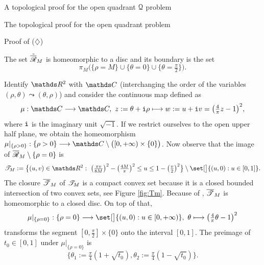 \documentclass[11pt, a4paper, english, twoside, notitlepage, openright]{report}
\begin{document}
\begin{chapter}{A topological proof for the open quadrant $\Qu$ problem}
\begin{section}{The topological proof for the open quadrant problem}
\begin{subsection}{Proof of ($\diamondsuit$)}
\begin{constr}
\begin{center}
\begin{tikzpicture}[scale=1.5]
\end{tikzpicture}
\end{center}

\em
\end{constr}

\begin{lemma}\label{}
The set $\tilde{\overline{\Rr}}_M$ is homeomorphic to a disc and its boundary is the set
$$
\pi_M\big(\{\rho=M\}\cup\{\theta=0\}\cup\{\theta=\tfrac{\pi}{2}\}\big).
$$
\begin{Proof}
Identify $\R^2$ with $\C$ (interchanging the order of the variables $(\rho,\theta)\leadsto(\theta,\rho)$) and consider the continuous map defined as 
$$
\mu:\C\longrightarrow\C,\ z:=\theta+{\tt i}\rho\longmapsto w:=u+{\tt i}v=\big(\tfrac{4}{\pi}z-1\big)^2,
$$
where ${\tt i}$ is the imaginary unit $\sqrt{-1}$. If we restrict ourselves to the open upper half plane, we obtain the homeomorphism $\mu|_{\{\rho>0\}}:\{\rho>0\}\longrightarrow\C\setminus\big([0,+\infty)\times\{0\}\big)$. Now observe that the image of $\overline{\Rr}_M\setminus\{\rho=0\}$ is
$$
\Tt_M:=\big\{(u,v)\in\R^2:\ \big(\tfrac{\pi v}{8M}\big)^2-\big(\tfrac{4M}{\pi}\big)^2\leq u\leq1-\big(\tfrac{v}{2}\big)^2\big\}\setminus\set[\big]{(u,0):u\in[0,1]}.
$$
The closure $\overline{\Tt}_M$ of $\Tt_M$ is a compact convex set because it is a closed bounded intersection of two convex sets, see Figure \ref{fig:Tm}. Because of \cite[Corolary 11.3.4]{b}, $\overline{\Tt}_M$ is homeomorphic to a closed disc. On top of that,
$$
\mu|_{\{\rho=0\}}:\{\rho=0\}\longrightarrow\set[\big]{(u,0):u\in[0,+\infty)},\ \theta\longmapsto\big(\tfrac{4}{\pi}\theta-1\big)^2
$$
transforms the segment $[0,\tfrac{\pi}{2}]\times\{0\}$ onto the interval $[0,1]$. The preimage of $t_0\in[0,1]$ under $\mu|_{\{\rho=0\}}$ is 
$$
\{\theta_1:=\tfrac{\pi}{4}(1+\sqrt{t_0}),\theta_2:=\tfrac{\pi}{4}(1-\sqrt{t_0})\}.
$$


\begin{figure}[!ht]
\begin{center}
\end{center}
\end{figure}
\end{Proof}
\end{lemma}
\end{subsection}
\end{section}
\end{chapter}
\end{document}
